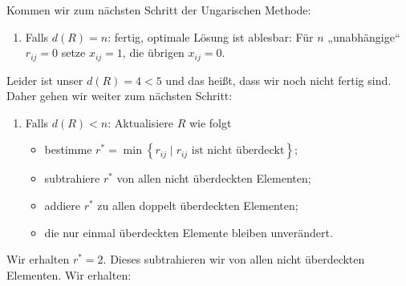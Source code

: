 \documentclass[
a4paper, %
11pt,
]
{scrartcl}
\begin{document}
Kommen wir zum nächsten Schritt der Ungarischen Methode:
\begin{enumerate}[(3)]
  \item Falls $d(R) = n$: fertig, optimale Lösung ist ablesbar: Für $n$
    „unabhängige“ $r_{ij} = 0$ setze $x_{ij} = 1$, die übrigen $x_{ij} = 0$.
\end{enumerate}
Leider ist unser $d(R) = 4 < 5$ und das heißt, dass wir noch nicht fertig sind.
Daher gehen wir weiter zum nächsten Schritt:
\begin{enumerate}[(4)]
  \item Falls $d(R) < n$: Aktualisiere $R$ wie folgt
    \begin{itemize}
      \item bestimme $r^* = \min \left\{ r_{ij} \mid r_{ij} \text{ ist nicht
        überdeckt} \right\}$;
      \item subtrahiere $r^*$ von allen nicht überdeckten Elementen;
      \item addiere $r^*$ zu allen doppelt überdeckten Elementen;
      \item die nur einmal überdeckten Elemente bleiben unverändert.
    \end{itemize}
\end{enumerate}
Wir erhalten $r^* = 2$. Dieses subtrahieren wir von allen nicht überdeckten
Elementen. Wir erhalten:
\end{document}
